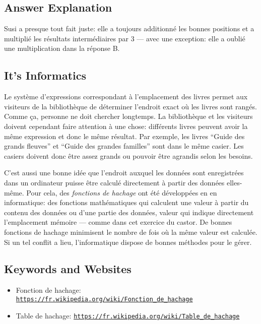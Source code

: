\documentclass[a4paper,11pt]{report}
\newcommand{\BrochureUrlText}[1]{\texttt{#1}}
\newcommand{\taskGraphicsFolder}{..}
\begin{document}
\endgroup

\subsection*{Answer Explanation}

Susi a presque tout fait juste: elle a toujours additionné les bonnes positions et a multiplié les résultats intermédiaires par $3$ — avec une exception: elle a oublié une multiplication dans la réponse B.

{\centering%
\par}


\subsection*{It’s Informatics}

Le système d’expressions correspondant à l’emplacement des livres permet aux visiteurs de la bibliothèque de déterminer l’endroit exact où les livres sont rangés. Comme ça, personne ne doit chercher longtemps. La bibliothèque et les visiteurs doivent cependant faire attention à une chose: différents livres peuvent avoir la même expression et donc le même résultat. Par exemple, les livres “Guide des grands fleuves” et “Guide des grandes familles” sont dans le même casier. Les casiers doivent donc être assez grands ou pouvoir être agrandis selon les besoins.

C’est aussi une bonne idée que l’endroit auxquel les données sont enregistrées dans un ordinateur puisse être calculé directement à partir des données elles-même. Pour cela, des \emph{fonctions de hachage} ont été développées en en informatique: des fonctions mathématiques qui calculent une valeur à partir du contenu des données ou d’une partie des données, valeur qui indique directement l’emplacement mémoire — comme dans cet exercice du castor. De bonnes fonctions de hachage minimisent le nombre de fois où la même valeur est calculée. Si un tel conflit a lieu, l’informatique dispose de bonnes méthodes pour le gérer.

{\raggedright

\subsection*{Keywords and Websites}

\begin{itemize}
  \item Fonction de hachage: \href{https://fr.wikipedia.org/wiki/Fonction_de_hachage}{\BrochureUrlText{https://fr.wikipedia.org/wiki/Fonction\_de\_hachage}}
  \item Table de hachage: \href{https://fr.wikipedia.org/wiki/Table_de_hachage}{\BrochureUrlText{https://fr.wikipedia.org/wiki/Table\_de\_hachage}}
\end{itemize}


}
\end{document}
